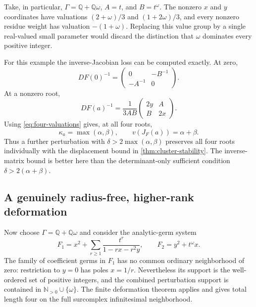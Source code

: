 \documentclass[11pt,letterpaper]{article}
\theoremstyle{definition}
\theoremstyle{remark}
\newcommand{\Q}{\mathbb Q}
\newcommand{\N}{\mathbb N}
\numberwithin{equation}{section}
\begin{document}
Take, in particular, $\Gamma=\Q+\Q\omega$, $A=t$, and $B=t^\omega$. The nonzero $x$ and $y$ coordinates have valuations $(2+\omega)/3$ and $(1+2\omega)/3$, and every nonzero residue weight has valuation $-(1+\omega)$. Replacing this value group by a single real-valued small parameter would discard the distinction that $\omega$ dominates every positive integer.

For this example the inverse-Jacobian loss can be computed exactly. At zero,
\[
 DF(0)^{-1}=\begin{pmatrix}0&-B^{-1}\\-A^{-1}&0\end{pmatrix}.
\]
At a nonzero root,
\[
 DF(a)^{-1}=\frac1{3AB}
 \begin{pmatrix}2y&A\\B&2x\end{pmatrix}.
\]
Using \eqref{eq:four-valuations} gives, at all four roots,
\begin{equation}\label{eq:example-kappa}
 \kappa_a=\max(\alpha,\beta),
 \qquad v(J_F(a))=\alpha+\beta.
\end{equation}
Thus a further perturbation with $\delta>2\max(\alpha,\beta)$ preserves all four roots individually with the displacement bound in \cref{thm:cluster-stability}. The inverse-matrix bound is better here than the determinant-only sufficient condition $\delta>2(\alpha+\beta)$.

\subsection{A genuinely radius-free, higher-rank deformation}\label{subsec:radius-free-example}
Now choose $\Gamma=\Q+\Q\omega$ and consider the analytic-germ system
\begin{equation}\label{eq:radius-free-system}
 F_1=x^2+\sum_{r\ge1}\frac{t^r}{1-rx-r^2y},\qquad
 F_2=y^2+t^\omega x.
\end{equation}
The family of coefficient germs in $F_1$ has no common ordinary neighborhood of zero: restriction to $y=0$ has poles $x=1/r$. Nevertheless its support is the well-ordered set of positive integers, and the combined perturbation support is contained in $\N_{>0}\cup\{\omega\}$. The finite deformation theorem applies and gives total length four on the full surcomplex infinitesimal neighborhood.
\end{document}
